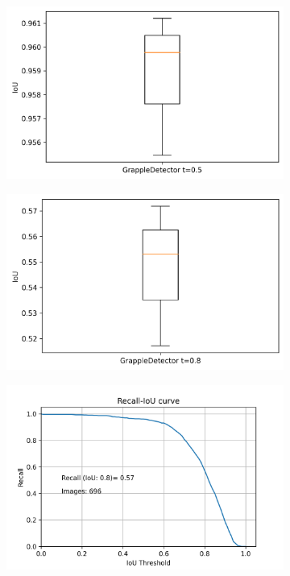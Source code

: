  	\begin{figure}[h]
 		\centering
 		\begin{subfigure}[c]{0.32\textwidth}			
 			\includegraphics[width=1\textwidth]{bilder/FazitUndAusblick/Grapple_TTAE_Res/IoU_TTAE_05.png}
 		\end{subfigure}
 		\begin{subfigure}[c]{0.32\textwidth}			
 			\includegraphics[width=1\textwidth]{bilder/FazitUndAusblick/Grapple_TTAE_Res/IoU_TTAE_08.png}
 		\end{subfigure}
 		\begin{subfigure}[c]{0.32\textwidth}			
 			\includegraphics[width=1\textwidth]{bilder/FazitUndAusblick/Grapple_TTAE_Res/Recall_IoU_TTAE.png}

\end{subfigure}
\end{figure}
